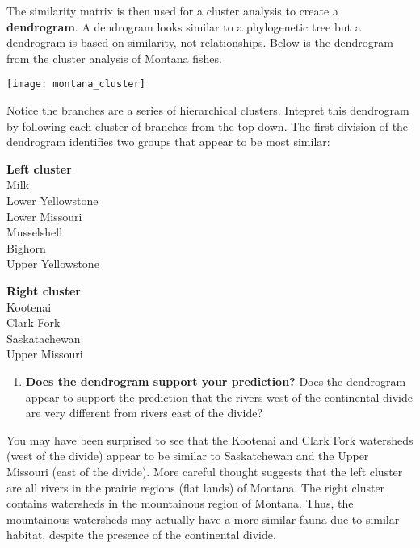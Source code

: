 \documentclass[11pt]{article}
\begin{document}
The similarity matrix is then used for a cluster analysis to create a \textbf{dendrogram}.
A dendrogram looks similar to a phylogenetic tree but a dendrogram is based on similarity, not relationships. %
Below is the dendrogram from the cluster analysis of Montana fishes.

	\texttt{[image: montana\_cluster]}

Notice the branches are a series of hierarchical clusters. Intepret this dendrogram
by following each cluster of branches from the top down. The first division of the dendrogram 
identifies two groups that appear to be most similar:

\begin{multicols}{2}
\textbf{Left cluster}\\
Milk\\
Lower Yellowstone\\
Lower Missouri\\
Musselshell\\
Bighorn\\
Upper Yellowstone
\columnbreak

\textbf{Right cluster}\\
Kootenai\\
Clark Fork\\
Saskatachewan\\
Upper Missouri
\end{multicols}

\begin{enumerate}[resume]
\item \textbf{Does the dendrogram support your prediction?} Does the dendrogram appear
to support the prediction that the rivers west of the continental divide are very different
from rivers east of the divide?%
\end{enumerate}

\newpage

You may have been surprised to see that the Kootenai and Clark Fork watersheds 
(west of the divide) appear to be similar to Saskatchewan and the Upper Missouri 
(east of the divide). More careful thought suggests that the left cluster are all rivers in
the prairie regions (flat lands) of Montana. The right cluster contains watersheds in
the mountainous region of Montana. Thus, the mountainous watersheds may actually
have a more similar fauna due to similar habitat, despite the presence of the continental
divide.
\end{document}
